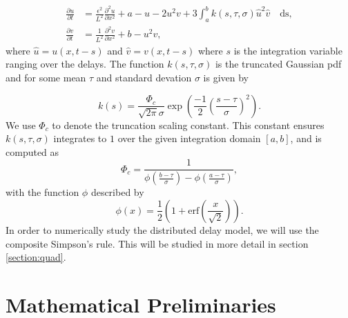 \begin{equation}\label{distmodel}
  \begin{split}
    \frac{\partial u}{\partial t}&=\frac{\epsilon^2}{L^2}\frac{\partial^2u}{\partial x^2}+a-u-2u^2v+3\int_{a}^{b}k(s,\tau,\sigma)\hat{u}^2\hat{v} \quad\text{ds},\\
    \frac{\partial v}{\partial t}&=\frac{1}{L^2}\frac{\partial^2v}{\partial x^2}+b-u^2v,
\end{split}
\end{equation}
where $\hat{u}=u(x,t-s)$ and $\hat{v}=v(x,t-s)$ where $s$ is the integration variable ranging over the delays. The function $k(s,\tau,\sigma)$ is the truncated Gaussian pdf and for some mean $\tau$ and standard devation $\sigma$ is given by \cite{wikitrunc}

\begin{equation}
  k(s)=\frac{\Phi_c}{\sqrt{2\pi}\sigma}\exp\left(\frac{-1}{2}\left(\frac{s-\tau}{\sigma}\right)^2\right).
\end{equation}
We use $\Phi_c$ to denote the truncation scaling constant. This constant ensures $k(s,\tau,\sigma)$ integrates to $1$ over the given integration domain $[a, b]$, and is computed as
\begin{equation}
\Phi_c=\frac{1}{\phi\left(\frac{b-\tau}{\sigma}\right)-\phi\left(\frac{a-\tau}{\sigma}\right)},
\end{equation}
with the function $\phi$ described by
\begin{equation}
\phi(x)=\frac{1}{2}\left(1+\text{erf}\left(\frac{x}{\sqrt{2}}\right)\right).
\end{equation}
In order to numerically study the distributed delay model, we will use the composite Simpson's rule. This will be studied in more detail in section \ref{section:quad}.

\section{Mathematical Preliminaries}
